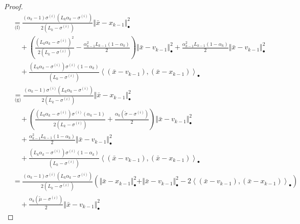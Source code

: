 \documentclass[12pt]{article}
\begin{document}
\begin{proof}
{\begin{align*}
            &\underset{\text{(f)}}{=}
            \frac{(\alpha_k - 1)\sigma^{(i)}\left(L_k\alpha_k - \sigma^{(i)}\right)}
            {2\left(L_k - \sigma^{(i)}\right)} \Vert \bar x - x_{k - 1}\Vert^2_\bullet
                \\ &\quad 
                + \left(
                    \frac{(L_k\alpha_k - \sigma^{(i)})^2}{2(L_k - \sigma^{(i)})} - \frac{\alpha_{k - 1}^2L_{k - 1}(1 - \alpha_k)}{2}
                \right) \Vert \bar x - v_{k - 1}\Vert^2_\bullet
                + \frac{\alpha_{k - 1}^2L_{k - 1}(1 - \alpha_k)}{2} \Vert \bar x - v_{k - 1}\Vert^2_\bullet
                \\&\quad 
                + \frac{(L_k\alpha_k  - \sigma^{(i)})\sigma^{(i)}(1 - \alpha_k)}{(L_k - \sigma^{(i)})}\left\langle (\bar x - v_{k - 1}),(\bar x - x_{k - 1})\right\rangle_\bullet
            \\
            & \underset{\text{(g)}}{=} 
            \frac{(\alpha_k - 1)\sigma^{(i)}\left(L_k\alpha_k - \sigma^{(i)}\right)}
            {2\left(L_k - \sigma^{(i)}\right)}\Vert \bar x - x_{k - 1}\Vert^2_\bullet
                \\ &\quad 
                + \left(
                    \frac{
                        \left(L_k \alpha_k - \sigma^{(i)}\right)\sigma^{(i)}
                        \left(\alpha_k - 1\right)
                    }
                    {2(L_k - \sigma^{(i)})}
                    + \frac{\alpha_k(\tilde\sigma - \sigma^{(i)})}{2}
                \right) 
                \Vert \bar x - v_{k - 1}\Vert^2_\bullet
                \\ &\quad 
                + \frac{\alpha_{k - 1}^2L_{k - 1}(1 - \alpha_k)}{2} \Vert \bar x - v_{k - 1}\Vert^2_\bullet
                \\ &\quad
                + \frac{(L_k\alpha_k  - \sigma^{(i)})\sigma^{(i)}(1 - \alpha_k)}{(L_k - \sigma^{(i)})}\left\langle (\bar x - v_{k - 1}),(\bar x - x_{k - 1})\right\rangle_\bullet
            \\
            &= 
            \frac{(\alpha_k - 1)\sigma^{(i)}\left(L_k\alpha_k - \sigma^{(i)}\right)}{2\left(L_k - \sigma^{(i)}\right)}
            \left(
                \Vert \bar x - x_{k - 1}\Vert^2_\bullet 
                + \Vert \bar x - v_{k - 1}\Vert^2_\bullet 
                - 2\left\langle (\bar x - v_{k - 1}),(\bar x - x_{k - 1})\right\rangle_\bullet
            \right) 
                \\ &\quad 
                + \frac{\alpha_k(\tilde\mu - \sigma^{(i)})}{2} \Vert \bar x - v_{k - 1}\Vert^2_\bullet

\end{align*}}
\end{proof}
\end{document}
